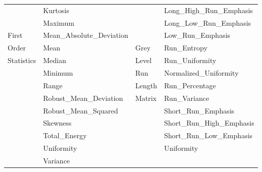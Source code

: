 \documentclass[final,1p,times,twocolumn]{elsarticle}
\begin{document}
\begin{table}[!b]
\begin{tabular}{| l | l | l | l |}
&Kurtosis&&Long\_High\_Run\_Emphasis\\
&Maximum&&Long\_Low\_Run\_Emphasis\\
First &Mean\_Absolute\_Deviation&&Low\_Run\_Emphasis\\
Order&Mean&Grey&Run\_Entropy\\
Statistics&Median& Level&Run\_Uniformity\\
&Minimum& Run &Normalized\_Uniformity\\
&Range&Length &Run\_Percentage\\
&Robust\_Mean\_Deviation&Matrix&Run\_Variance\\
&Robust\_Mean\_Squared&&Short\_Run\_Emphasis\\
&Skewness&&Short\_Run\_High\_Emphasis\\
&Total\_Energy&&Short\_Run\_Low\_Emphasis\\
&Uniformity&&Uniformity\\
&Variance&&\\
\hline
\end{tabular}
\end{table}
\end{document}
